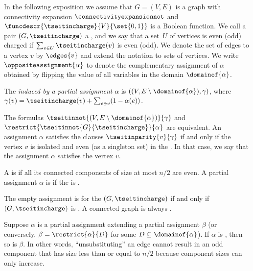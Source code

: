 \documentclass{toc}
\begin{document}
In the following exposition we assume that $G=(V,E)$ is a graph with connectivity expansion $\connectivityexpansionnot$ and $\funcdescr{\tseitincharge}{V}{\set{0,1}}$ is a Boolean function. We call a pair $(G,\tseitincharge)$ a \introduceterm{\chargedgraph}, and we say that a %
set~$U$ of vertices
is even (odd) charged if $\sum_{v\in U}\tseitincharge(v)$ is even (odd).
We denote the set of edges  to a vertex $v$ by $\edges{v}$ and extend the notation to sets of vertices.
We write
  $\oppositeassignment{\alpha}$
  to denote the complementary assignment
  of $\alpha$
  obtained by flipping the value of all
  variables in the domain
  $\domainof{\alpha}$.

\begin{definition}
  \label{def:induced-graph}
  The \emph{\chargedgraph induced by a partial assignment} $\alpha$ is $((V,E\setminus \domainof{\alpha}),\gamma)$, where $\gamma(v) = \tseitincharge(v) + \sum_{e \ni v}(1 - \alpha(e))$.
\end{definition}

\begin{observation}
  \label{obs:induced-graph-and-assignments}
  The formulas $\tseitinnot{(V,E\setminus \domainof{\alpha})}{\gamma}$ and $\restrict{\tseitinnot{G}{\tseitincharge}}{\alpha}$ are equivalent. An assignment $\alpha$ satisfies the clauses $\tseitinparity{v}{\gamma}$ if and only if the vertex $v$ is isolated and even (as a singleton set) in the \inducedgraph{$\alpha$}. In that case, we say that the assignment $\alpha$ satisfies the vertex $v$.
\end{observation}

\begin{definition}[\nonsplittingassignment]
  \label{def:non-splitting-assignment} A \chargedgraph is \introduceterm{\Gnonsplittingnot} if all its connected components of size at most $n/2$ are even. A partial assignment $\alpha$ is \emph{\nonsplitting} if the \inducedgraph{$\alpha$} is \Gnonsplitting.
\end{definition}

\begin{observation}
 \label{obs:empty-assignment}
 The empty assignment is \nonsplitting for the \chargedgraph
 $(G,\tseitincharge)$ if and only if $(G,\tseitincharge)$ is \Gnonsplittingnot. A connected graph is always \Gnonsplittingnot.
\end{observation}

\begin{observation}
 \label{obs:restriction-non-splitting}
 Suppose $\alpha$ is a partial assignment extending a partial assignment $\beta$ (or conversely, $\beta = \restrict{\alpha}{D}$ for some $D \subseteq \domainof{\alpha}$). If $\alpha$ is \nonsplitting, then so is $\beta$. In other words, ``unsubstituting'' an edge cannot result in an odd component that has size less than or equal to $n/2$ because component sizes can only increase.
\end{observation}
\end{document}

